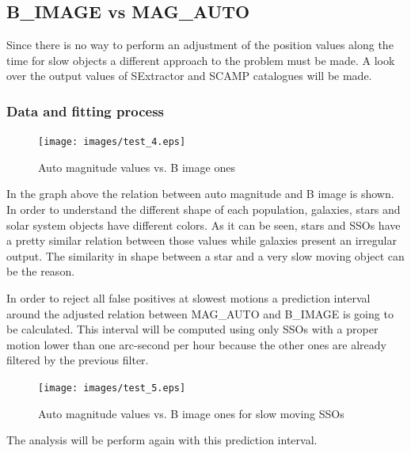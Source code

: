 \documentclass{article}
\begin{document}
\subsection{B\_IMAGE vs MAG\_AUTO}
Since there is no way to perform an adjustment of the position values along the time for slow objects a different approach to the problem must be made. A look over the output values of SExtractor and SCAMP catalogues will be made.

\subsubsection{Data and fitting process}

\begin{figure}[H]
\centering
\texttt{[image: images/test\_4.eps]}
\caption{Auto magnitude values vs. B image ones}
\end{figure}

\par In the graph above the relation between auto magnitude and B image is shown. In order to understand the different shape of each population, galaxies, stars and solar system objects have different colors. As it can be seen, stars and SSOs have a pretty similar relation between those values while galaxies present an irregular output. The similarity in shape between a star and a very slow moving object can be the reason.
\par In order to reject all false positives at slowest motions a prediction interval around the adjusted relation between MAG\_AUTO and B\_IMAGE is going to be calculated. This interval will be computed using only SSOs with a proper motion lower than one arc-second per hour because the other ones are already filtered by the previous filter.

\begin{figure}[H]
\centering
\texttt{[image: images/test\_5.eps]}
\caption{Auto magnitude values vs. B image ones for slow moving SSOs}
\end{figure}

The analysis will be perform again with this prediction interval.
\end{document}
